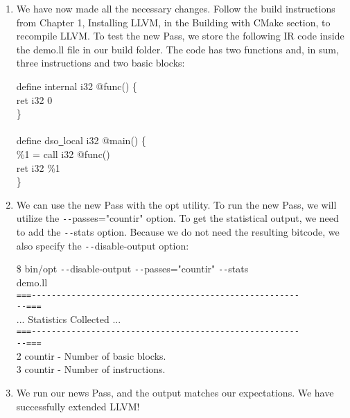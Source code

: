 \begin{enumerate}
\item We have now made all the necessary changes. Follow the build instructions from Chapter 1, Installing LLVM, in the Building with CMake section, to recompile LLVM. To test the new Pass, we store the following IR code inside the demo.ll file in our build folder. The code has two functions and, in sum, three instructions and two basic blocks:
\begin{tcolorbox}[colback=white,colframe=black]
define internal i32 @func() \{ \\
\hspace*{0.5cm}ret i32 0 \\
\} \\
\\
define dso\underline{~}local i32 @main() \{ \\
\hspace*{0.5cm}	\%1 = call i32 @func() \\
\hspace*{0.5cm}	ret i32 \%1 \\
\}
\end{tcolorbox}

\item We can use the new Pass with the opt utility. To run the new Pass, we will utilize the \verb|--|passes="countir" option. To get the statistical output, we need to add the \verb|--|stats option. Because we do not need the resulting bitcode, we also specify the \verb|--|disable-output option:
\begin{tcolorbox}[colback=white,colframe=black]
\$ bin/opt \verb|--|disable-output \verb|--|passes="countir" \verb|--|stats  \\
demo.ll \\
\verb|===------------------------------------------------------| \\
\verb|--===| \\
... Statistics Collected ... \\
\verb|===------------------------------------------------------| \\
\verb|--===| \\
2 countir - Number of basic blocks. \\
3 countir - Number of instructions.
\end{tcolorbox}

\item We run our news Pass, and the output matches our expectations. We have successfully extended LLVM!

\end{enumerate}

